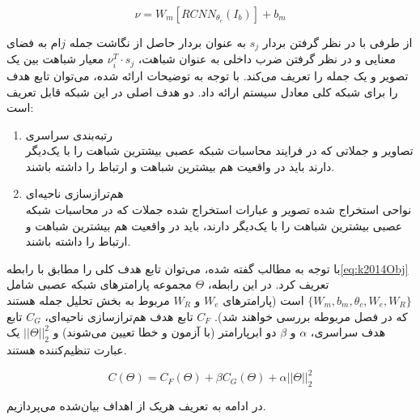 \begin{equation}
\nu = W_m[RCNN_{\theta_c}(I_b)] + b_m
\label{eq:k2014ISV}
\end{equation}

از طرفی با در نظر گرفتن بردار $s_j$ به عنوان بردار حاصل از نگاشت جمله $j$ام به فضای معنایی و در نظر گرفتن ضرب داخلی به عنوان شباهت، $\nu_i^T \cdot s_j$
معیار شباهت بین یک تصویر و یک جمله را تعریف می‌کند.
با توجه به توضیحات ارائه شده، می‌توان تابع هدف را برای شبکه کلی معادل سیستم ارائه داد. دو هدف اصلی در این شبکه قابل تعریف است:
\begin{enumerate}
	\item رتبه‌بندی سراسری\\
	تصاویر و جملاتی که در فرایند محاسبات شبکه عصبی بیشترین شباهت را با یک‌دیگر دارند باید در واقعیت هم بیشترین شباهت و ارتباط را داشته باشند.
	\item هم‌ترازسازی ناحیه‌ای\\
	نواحی استخراج شده تصویر و عبارات استخراج شده جملات که در محاسبات شبکه عصبی بیشترین شباهت را با یک‌دیگر دارند، باید در واقعیت هم بیشترین شباهت و ارتباط را داشته باشند.
\end{enumerate}

با توجه به مطالب گفته شده، می‌توان تابع هدف کلی را مطابق با رابطه\ref{eq:k2014Obj}
تعریف کرد.
در این رابطه، $\Theta$ مجموعه پارامترهای شبکه عصبی شامل 
$\{W_m,b_m,\theta_c,W_e,W_R\}$
است (پارامترهای $W_e$ و‌ $W_R$ مربوط به بخش تحلیل جمله هستند که در فصل مربوطه بررسی خواهند شد). $C_F$ تابع هدف هم‌ترازسازی ناحیه‌ای، $C_G$ تابع هدف سراسری، $\alpha$ و $\beta$ دو ابرپارامتر (با آزمون و خطا تعیین می‌شوند) و $||\Theta||_2^2$ یک عبارت تنظیم‌کننده هستند.

\begin{equation}
C(\Theta) = C_F(\Theta) + \beta C_G(\Theta) + \alpha ||\Theta||_2^2
\label{eq:k2014Obj}
\end{equation}

در ادامه به تعریف هریک از اهداف بیان‌شده می‌پردازیم.

